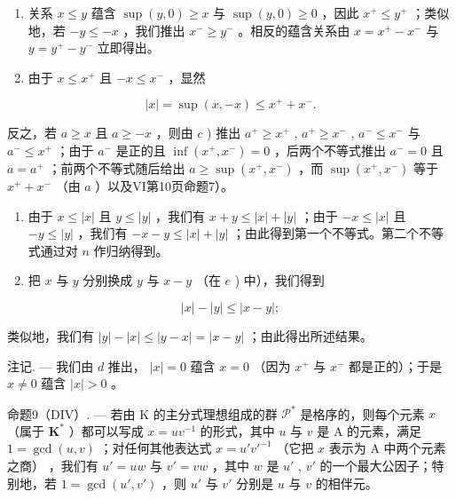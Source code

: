 \begin{enumerate}
\def\labelenumi{\alph{enumi})}
\setcounter{enumi}{2}
\item
  关系 \(x \leqslant y\) 蕴含 \(\sup (y, 0) \geqslant x\) 与 \(\sup (y, 0) \geqslant 0\) ，因此 \(x^{+} \leqslant y^{+}\) ；类似地，若 \(-y \leqslant -x\) ，我们推出 \(x^{-} \geqslant y^{-}\) 。相反的蕴含关系由 \(x = x^{+} - x^{-}\) 与 \(y = y^{+} - y^{-}\) 立即得出。
\item
  由于 \(x \leqslant x^{+}\) 且 \(-x \leqslant x^{-}\) ，显然
\end{enumerate}

\[
\left| x \right| = \sup (x, - x) \leqslant x ^ {+} + x ^ {-}.
\]

反之，若 \(a \geqslant x\) 且 \(a \geqslant -x\) ，则由 \(c\) ) 推出 \(a^+ \geqslant x^+\) , \(a^+ \geqslant x^-\) , \(a^- \leqslant x^-\) 与 \(a^- \leqslant x^+\) ；由于 \(a^-\) 是正的且 \(\inf(x^+, x^-) = 0\) ，后两个不等式推出 \(a^- = 0\) 且 \(a = a^+\) ；前两个不等式随后给出 \(a \geqslant \sup(x^+, x^-)\) ，而 \(\sup(x^+, x^-)\) 等于 \(x^+ + x^-\) （由 \(a\) ）以及VI第10页命题7）。

\begin{enumerate}
\def\labelenumi{\alph{enumi})}
\setcounter{enumi}{4}
\item
  由于 \(x \leqslant |x|\) 且 \(y \leqslant |y|\) ，我们有 \(x + y \leqslant |x| + |y|\) ；由于 \(-x \leqslant |x|\) 且 \(-y \leqslant |y|\) ，我们有 \(-x - y \leqslant |x| + |y|\) ；由此得到第一个不等式。第二个不等式通过对 \(n\) 作归纳得到。
\item
  把 \(x\) 与 \(y\) 分别换成 \(y\) 与 \(x - y\) （在 \(e\) ) 中），我们得到
\end{enumerate}

\[
\left| x \right| - \left| y \right| \leqslant \left| x - y \right|;
\]

类似地，我们有 \(|y| - |x| \leqslant |y - x| = |x - y|\) ；由此得出所述结果。

注记. --- 我们由 \(d\) 推出， \(|x|=0\) 蕴含 \(x=0\) （因为 \(x^{+}\) 与 \(x^{-}\) 都是正的）；于是 \(x\neq0\) 蕴含 \(|x|>0\) 。

命题9（DIV）. --- 若由 K 的主分式理想组成的群 \(\mathcal{P}^*\) 是格序的，则每个元素 \(x\) （属于 \(\mathbf{K}^*\) ）都可以写成 \(x = uv^{-1}\) 的形式，其中 \(u\) 与 \(v\) 是 A 的元素，满足 \(1 = \gcd(u, v)\) ；对任何其他表达式 \(x = u'v'^{-1}\) （它把 \(x\) 表示为 A 中两个元素之商） ，我们有 \(u' = uw\) 与 \(v' = vw\) ，其中 \(w\) 是 \(u'\) , \(v'\) 的一个最大公因子；特别地，若 \(1 = \gcd(u', v')\) ，则 \(u'\) 与 \(v'\) 分别是 \(u\) 与 \(v\) 的相伴元。

